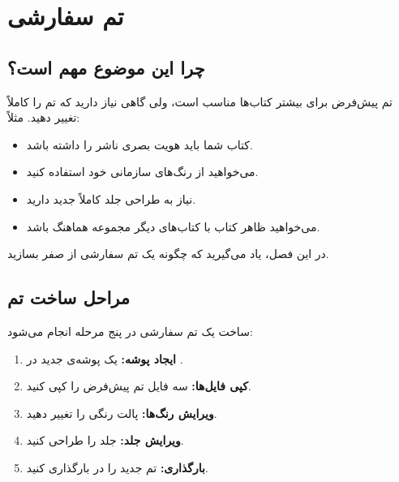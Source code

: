 
\chapter{تم سفارشی}
\label{chap:custom-theme}

\section{چرا این موضوع مهم است؟}
\label{sec:custom-theme-why}

تم پیش‌فرض  برای بیشتر کتاب‌ها
مناسب است، ولی گاهی نیاز دارید که تم را
کاملاً تغییر دهید. مثلاً:

\begin{itemize}
    \item کتاب شما باید هویت بصری ناشر را
    داشته باشد.
    \item می‌خواهید از رنگ‌های سازمانی خود
    استفاده کنید.
    \item نیاز به طراحی جلد کاملاً جدید دارید.
    \item می‌خواهید ظاهر کتاب با کتاب‌های دیگر
    مجموعه هماهنگ باشد.
\end{itemize}

در این فصل، یاد می‌گیرید که چگونه یک تم
سفارشی از صفر بسازید.


\section{مراحل ساخت تم}
\label{sec:custom-theme-steps}

ساخت یک تم سفارشی در پنج مرحله انجام
می‌شود:

\begin{enumerate}
    \item \textbf{ایجاد پوشه:} یک پوشه‌ی
    جدید در .
    \item \textbf{کپی فایل‌ها:} سه فایل تم
    پیش‌فرض را کپی کنید.
    \item \textbf{ویرایش رنگ‌ها:} پالت رنگی
    را تغییر دهید.
    \item \textbf{ویرایش جلد:} جلد را طراحی
    کنید.
    \item \textbf{بارگذاری:} تم جدید را در
     بارگذاری کنید.
\end{enumerate}

